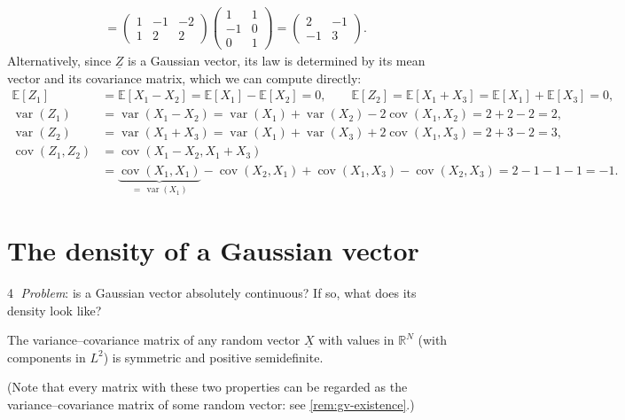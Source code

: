 \begin{example}
\[\begin{aligned}
  &=\begin{pmatrix}1&-1&-2\\1&2&2\end{pmatrix}\begin{pmatrix}1&1\\-1&0\\0&1\end{pmatrix}
  =\begin{pmatrix}2&-1\\-1&3\end{pmatrix}.
\end{aligned}
\]
Alternatively, since $\underline Z$ is a Gaussian vector, its law is determined by its mean vector
and its covariance matrix, which we can compute directly:
\[
\begin{aligned}
  \mathbb E[Z_1]&=\mathbb E[X_1-X_2]=\mathbb E[X_1]-\mathbb E[X_2]=0,\qquad
  \mathbb E[Z_2]=\mathbb E[X_1+X_3]=\mathbb E[X_1]+\mathbb E[X_3]=0,\\
  \operatorname{var}(Z_1)&=\operatorname{var}(X_1-X_2)=\operatorname{var}(X_1)+\operatorname{var}(X_2)-2\operatorname{cov}(X_1,X_2)=2+2-2=2,\\
  \operatorname{var}(Z_2)&=\operatorname{var}(X_1+X_3)=\operatorname{var}(X_1)+\operatorname{var}(X_3)+2\operatorname{cov}(X_1,X_3)=2+3-2=3,\\
  \operatorname{cov}(Z_1,Z_2)&=\operatorname{cov}(X_1-X_2,X_1+X_3)\\
  &=\underbrace{\operatorname{cov}(X_1,X_1)}_{=\,\operatorname{var}(X_1)}-\operatorname{cov}(X_2,X_1)+\operatorname{cov}(X_1,X_3)-\operatorname{cov}(X_2,X_3)
  =2-1-1-1=-1 .
\end{aligned}
\]
\end{example}

\section{The density of a Gaussian vector}\label{sec:gv-density}

\textcircled{\scriptsize 4} \emph{Problem}: is a Gaussian vector absolutely continuous? If so, what
does its density look like?

\begin{lemma}\label{lem:gv-covariance-psd}
The variance--covariance matrix of any random vector $\underline X$ with values in $\mathbb R^N$
(with components in $L^2$) is symmetric and positive semidefinite.
\end{lemma}

(Note that every matrix with these two properties can be regarded as the variance--covariance
matrix of some random vector: see \cref{rem:gv-existence}.)


